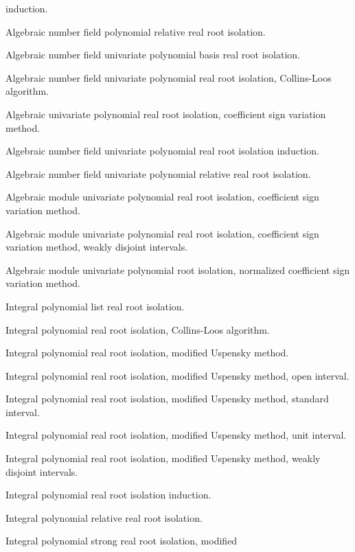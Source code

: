 \begin{description}
\begin{description}
    induction.
  \item[AFPRRI]  Algebraic number field polynomial relative real root
    isolation.
  \item[AFUPBRI]  Algebraic number field univariate polynomial basis real root
    isolation.
  \item[AFUPRICL]  Algebraic number field univariate polynomial real root
    isolation, Collins-Loos algorithm.
  \item[AFUPRICS]  Algebraic univariate polynomial real root isolation,
    coefficient sign variation method.
  \item[AFUPRII]  Algebraic number field univariate polynomial real root
    isolation induction.
  \item[AFUPRRI]  Algebraic number field univariate polynomial relative real
    root isolation.
  \item[AMUPRICS]  Algebraic module univariate polynomial real root isolation,
    coefficient sign variation method.
  \item[AMUPRICSW]  Algebraic module univariate polynomial real root
    isolation, coefficient sign variation method, weakly disjoint intervals.
  \item[AMUPRINCS]  Algebraic module univariate polynomial root isolation,
    normalized coefficient sign variation method.
  \item[IPLRRI]  Integral polynomial list real root isolation.
  \item[IPRICL]  Integral polynomial real root isolation, Collins-Loos
    algorithm.
  \item[IPRIM]  Integral polynomial real root isolation, modified Uspensky
    method.
  \item[IPRIMO]  Integral polynomial real root isolation, modified Uspensky
    method, open interval.
  \item[IPRIMS]  Integral polynomial real root isolation, modified Uspensky
    method, standard interval.
  \item[IPRIMU]  Integral polynomial real root isolation, modified Uspensky
    method, unit interval.
  \item[IPRIMW]  Integral polynomial real root isolation, modified Uspensky
    method, weakly disjoint intervals.
  \item[IPRRII]  Integral polynomial real root isolation induction.
  \item[IPRRRI]  Integral polynomial relative real root isolation.
  \item[IPSRM]  Integral polynomial strong real root isolation, modified

\end{description}
\end{description}
